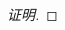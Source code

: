\documentclass[a4paper, 12pt]{article} %
\begin{document}
\begin{CJK}{UTF8}{gkai}
\begin{proof}[证明]
\begin{comment}
由于 $P,Q$ 为齐次方程,因此
$$
P(tx,ty)=t^mP(x,y).
$$
令 $t=\frac{1}{x}$,可得
$$
P(1,\frac{y}{x})=\frac{1}{x^m}P(x,y).
$$
且我们有
$$
Q(tx,ty)=t^mQ(x,y).
$$
令 $t=\frac{1}{x}$,可得
$$
Q(1,\frac{y}{x})=\frac{1}{x^m}Q(x,y).
$$
因此我们得到微分方程
$$
x^mP(1,\frac{y}{x})dx+x^mQ(1,\frac{y}{x})dy=0.
$$
当 $x\neq 0$ 时,即
$$
P(1,\frac{y}{x})dx+Q(1,\frac{y}{x})dy=0.
$$



利用分组法.我们先看微分方程
$$
P(x,y)dx=0,
$$
\end{comment}
\begin{comment}
我们在齐次方程两边同时乘以非零函数 $\frac{1}{xP+yQ}$,可得
\begin{equation}
  \label{eq:1}
  \frac{1}{xP+yQ}P(x,y)dx+\frac{1}{xP+yQ}Q(x,y)dy=0.
\end{equation}
我们来证明 \eqref{eq:1} 是恰当微分方程,即证明
$$
\frac{\pa \frac{1}{xP+yQ}}{\pa y}P+\frac{1}{xP+yQ}\frac{\pa P}{\pa
  y}=\frac{\frac{1}{xP+yQ}}{\pa x}Q+\frac{1}{xP+yQ}\frac{\pa Q}{\pa x}.
$$
也即证明
\begin{align*}
&  \frac{-1}{(xP+yQ)^2}(x \frac{\pa P}{\pa y}+Q+y \frac{\pa Q}{\pa
    y})P+\frac{1}{xP+yQ}\frac{\pa P}{\pa y}\\&=\frac{-1}{(xP+yQ)^2}(P+x
  \frac{\pa P}{\pa x}+y \frac{\pa Q}{\pa x})Q+\frac{1}{xP+yQ}\frac{\pa
  Q}{\pa x}.
\end{align*}
即证明
\begin{align*}
&  \frac{-1}{(xP+yQ)}(x \frac{\pa P}{\pa y}+y \frac{\pa Q}{\pa
    y})P+\frac{\pa P}{\pa y}\\&=\frac{-1}{(xP+yQ)}(x
  \frac{\pa P}{\pa x}+y \frac{\pa Q}{\pa x})Q+\frac{\pa
  Q}{\pa x}.
\end{align*}
两边同时乘以 $xP+yQ$,即证明
\begin{align*}
  -(x \frac{\pa P}{\pa y}+y \frac{\pa Q}{\pa y})P+\frac{\pa P}{\pa
    y}(xP+yQ)=-(x \frac{\pa P}{\pa x}+y \frac{\pa Q}{\pa
    x})Q+\frac{\pa Q}{\pa x}(xP+yQ).
\end{align*}
我们知道,
$$
P(tx,ty)=t^mP(x,y),Q(tx,ty)=t^mQ(x,y),
$$
\end{comment}
  \end{proof}

  
  
  
  
  
\end{CJK}
\end{document}
